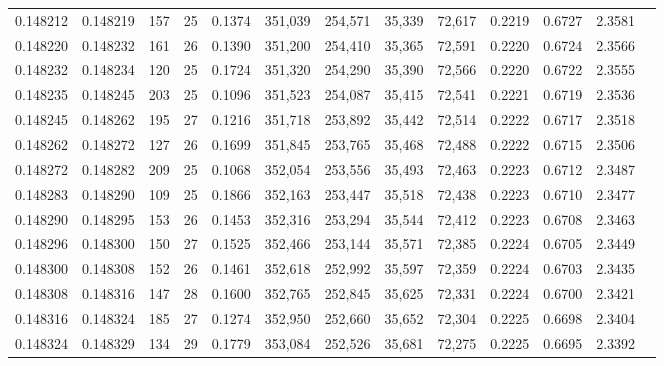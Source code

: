 \begin{tabular}{rrrrrrrrrrrrr}
0.148212 & 0.148219 & 157 &  25 &                                     0.1374 & 351,039 & 254,571 &  35,339 &  72,617 & 0.2219 & 0.6727 & 2.3581 \\
0.148220 & 0.148232 & 161 &  26 &                                     0.1390 & 351,200 & 254,410 &  35,365 &  72,591 & 0.2220 & 0.6724 & 2.3566 \\
0.148232 & 0.148234 & 120 &  25 &                                     0.1724 & 351,320 & 254,290 &  35,390 &  72,566 & 0.2220 & 0.6722 & 2.3555 \\
0.148235 & 0.148245 & 203 &  25 &                                     0.1096 & 351,523 & 254,087 &  35,415 &  72,541 & 0.2221 & 0.6719 & 2.3536 \\
0.148245 & 0.148262 & 195 &  27 &                                     0.1216 & 351,718 & 253,892 &  35,442 &  72,514 & 0.2222 & 0.6717 & 2.3518 \\
0.148262 & 0.148272 & 127 &  26 &                                     0.1699 & 351,845 & 253,765 &  35,468 &  72,488 & 0.2222 & 0.6715 & 2.3506 \\
0.148272 & 0.148282 & 209 &  25 &                                     0.1068 & 352,054 & 253,556 &  35,493 &  72,463 & 0.2223 & 0.6712 & 2.3487 \\
0.148283 & 0.148290 & 109 &  25 &                                     0.1866 & 352,163 & 253,447 &  35,518 &  72,438 & 0.2223 & 0.6710 & 2.3477 \\
0.148290 & 0.148295 & 153 &  26 &                                     0.1453 & 352,316 & 253,294 &  35,544 &  72,412 & 0.2223 & 0.6708 & 2.3463 \\
0.148296 & 0.148300 & 150 &  27 &                                     0.1525 & 352,466 & 253,144 &  35,571 &  72,385 & 0.2224 & 0.6705 & 2.3449 \\
0.148300 & 0.148308 & 152 &  26 &                                     0.1461 & 352,618 & 252,992 &  35,597 &  72,359 & 0.2224 & 0.6703 & 2.3435 \\
0.148308 & 0.148316 & 147 &  28 &                                     0.1600 & 352,765 & 252,845 &  35,625 &  72,331 & 0.2224 & 0.6700 & 2.3421 \\
0.148316 & 0.148324 & 185 &  27 &                                     0.1274 & 352,950 & 252,660 &  35,652 &  72,304 & 0.2225 & 0.6698 & 2.3404 \\
0.148324 & 0.148329 & 134 &  29 &                                     0.1779 & 353,084 & 252,526 &  35,681 &  72,275 & 0.2225 & 0.6695 & 2.3392 \\

\end{tabular}
